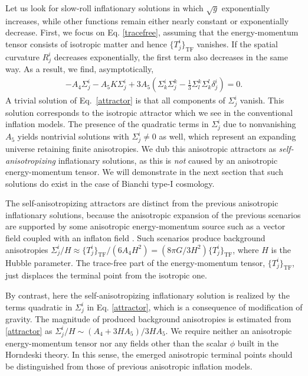 \documentclass[aps,prd,preprint,superscriptaddress,nofootinbib,tightenlines]{revtex4-1}
\begin{document}
Let us look for slow-roll inflationary solutions
in which $\sqrt{g}$ exponentially increases,
while other functions remain either nearly constant or exponentially decrease.
First,
we focus on Eq. \eqref{tracefree}, assuming that
 the energy-momentum tensor consists of isotropic matter
and hence $\{ T^i_j \}_\mathrm{TF}$ vanishes.
If the spatial curvature
$R^i_j$ decreases exponentially,
the first term also decreases in the same way.
As a result, we find, asymptotically,
\begin{eqnarray}
-A_4 \Sigma^i_j - A_5 K \Sigma^i_j + 3 A_5 ( \Sigma^i_k \Sigma^k_j - \frac{1}{3}\Sigma^k_l \Sigma^l_k \delta^i_j) = 0 .
\label{attractor}
\end{eqnarray}
A trivial solution of Eq.~\eqref{attractor} is that all components of $\Sigma^i_j$ vanish.
This solution corresponds to the isotropic attractor
which we see in the conventional inflation models.
The presence of the quadratic terms
in $\Sigma^i_j$ due to nonvanishing $A_5$ yields nontrivial solutions with
$\Sigma^i_j\neq 0$ as well,
which represent an expanding universe retaining
finite anisotropies.
We dub this anisotropic attractors as {\em self-anisotropizing} inflationary solutions,
as this is {\em not} caused by an anisotropic energy-momentum tensor.
We will demonstrate in the next section that such solutions do exist
in the case of Bianchi type-I cosmology.


The self-anisotropizing attractors are distinct from the previous
anisotropic inflationary solutions, because the anisotropic expansion of
the previous scenarios are supported by some anisotropic energy-momentum source
such as a vector field coupled with an inflaton field \cite{Watanabe:2009ct}.
Such scenarios produce background anisotropies
$\Sigma^i_j/H \approx \{T^i_j \}_\mathrm{TF}/(6 A_4 H^2) = (8\pi G/3H^2) \{T^i_j \}_\mathrm{TF} $,
where $H$ is the Hubble parameter.
The trace-free part of the energy-momentum tensor, $\{T^i_j \}_\mathrm{TF}$,
just displaces the terminal point from the isotropic one.




By contrast, here
the self-anisotropizing inflationary solution
is realized by the terms quadratic in $\Sigma^i_j$ in Eq. \eqref{attractor},
which is a consequence of modification of gravity.
The magnitude of produced background anisotropies is
estimated from \eqref{attractor}
as $\Sigma^i_j/H\sim (A_4 + 3 H A_5)/3 H A_5$.
We require neither an anisotropic energy-momentum tensor
nor any fields other than the scalar $\phi$ built in the Horndeski theory.
In this sense, the emerged anisotropic terminal points should be distinguished from
those of previous anisotropic inflation models.
\end{document}
